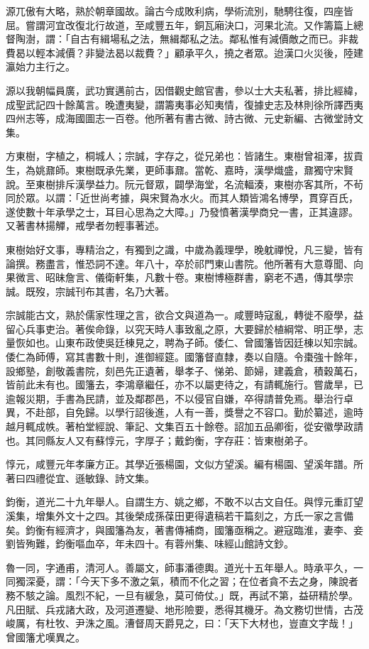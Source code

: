 \begin{pinyinscope}
源兀傲有大略，熟於朝章國故。論古今成敗利病，學術流別，馳騁往復，四座皆屈。嘗謂河宜改復北行故道，至咸豐五年，銅瓦廂決口，河果北流。又作籌篇上總督陶澍，謂：「自古有緝場私之法，無緝鄰私之法。鄰私惟有減價敵之而已。非裁費曷以輕本減價？非變法曷以裁費？」顧承平久，撓之者眾。迨漢口火災後，陸建瀛始力主行之。

源以我朝幅員廣，武功實邁前古，因借觀史館官書，參以士大夫私著，排比經緯，成聖武記四十餘萬言。晚遭夷變，謂籌夷事必知夷情，復據史志及林則徐所譯西夷四州志等，成海國圖志一百卷。他所著有書古微、詩古微、元史新編、古微堂詩文集。

方東樹，字植之，桐城人；宗誠，字存之，從兄弟也：皆諸生。東樹曾祖澤，拔貢生，為姚鼐師。東樹既承先業，更師事鼐。當乾、嘉時，漢學熾盛，鼐獨守宋賢說。至東樹排斥漢學益力。阮元督眾，闢學海堂，名流輻湊，東樹亦客其所，不茍同於眾。以謂：「近世尚考據，與宋賢為水火。而其人類皆鴻名博學，貫穿百氏，遂使數十年承學之士，耳目心思為之大障。」乃發憤著漢學商兌一書，正其違謬。又著書林揚觶，戒學者勿輕事著述。

東樹始好文事，專精治之，有獨到之識，中歲為義理學，晚躭禪悅，凡三變，皆有論撰。務盡言，惟恐詞不達。年八十，卒於祁門東山書院。他所著有大意尊聞、向果微言、昭昧詹言、儀衛軒集，凡數十卷。東樹博極群書，窮老不遇，傳其學宗誠。既歿，宗誠刊布其書，名乃大著。

宗誠能古文，熟於儒家性理之言，欲合文與道為一。咸豐時寇亂，轉徙不廢學，益留心兵事吏治。著俟命錄，以究天時人事致亂之原，大要歸於植綱常、明正學，志量恢如也。山東布政使吳廷棟見之，聘為子師。倭仁、曾國籓皆因廷棟以知宗誠。倭仁為師傅，寫其書數十則，進御經筵。國籓督直隸，奏以自隨。令棗強十餘年，設鄉塾，創敬義書院，刻邑先正遺著，舉孝子、悌弟、節婦，建義倉，積穀萬石，皆前此未有也。國籓去，李鴻章繼任，亦不以屬吏待之，有請輒施行。嘗歲旱，已逾報災期，手書為民請，並及鄰郡邑，不以侵官自嫌，卒得請普免焉。舉治行卓異，不赴部，自免歸。以學行詔後進，人有一善，獎譽之不容口。勤於纂述，逾時越月輒成帙。著柏堂經說、筆記、文集百五十餘卷。詔加五品卿銜，從安徽學政請也。其同縣友人又有蘇惇元，字厚子；戴鈞衡，字存莊：皆東樹弟子。

惇元，咸豐元年孝廉方正。其學近張楊園，文似方望溪。編有楊園、望溪年譜。所著曰四禮從宜、遜敏錄、詩文集。

鈞衡，道光二十九年舉人。自謂生方、姚之鄉，不敢不以古文自任。與惇元重訂望溪集，增集外文十之四。其後榮成孫葆田更得遺稿若干篇刻之，方氏一家之言備矣。鈞衡有經濟才，與國籓為友，著書傳補商，國籓亟稱之。避寇臨淮，妻李、妾劉皆殉難，鈞衡嘔血卒，年未四十。有蓉州集、味經山館詩文鈔。

魯一同，字通甫，清河人。善屬文，師事潘德輿。道光十五年舉人。時承平久，一同獨深憂，謂：「今天下多不激之氣，積而不化之習；在位者貪不去之身，陳說者務不駭之論。風烈不紀，一旦有緩急，莫可倚仗。」既，再試不第，益研精於學。凡田賦、兵戎諸大政，及河道遷變、地形險要，悉得其機牙。為文務切世情，古茂峻厲，有杜牧、尹洙之風。漕督周天爵見之，曰：「天下大材也，豈直文字哉！」曾國籓尤嘆異之。


\end{pinyinscope}
